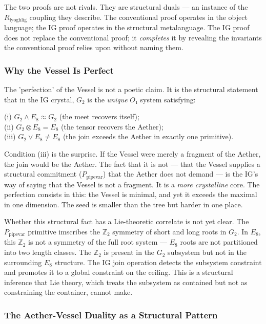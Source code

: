 \documentclass[12pt,a4paper]{article}
\begin{document}
The two proofs are not rivals. They are structural duals --- an instance of the $R_{\text{lyoghlig}}$ coupling they describe. The conventional proof operates in the object language; the IG proof operates in the structural metalanguage. The IG proof does not replace the conventional proof; it \emph{completes} it by revealing the invariants the conventional proof relies upon without naming them.

\subsubsection{Why the Vessel Is Perfect}

The 'perfection' of the Vessel is not a poetic claim. It is the structural statement that in the IG crystal, $G_2$ is the \emph{unique} $O₁$ system satisfying:

(i) $G_2 \wedge E_8 \approx G_2$ (the meet recovers itself); \\
(ii) $G_2 \otimes E_8 = E_8$ (the tensor recovers the Aether); \\
(iii) $G_2 \vee E_8 \neq E_8$ (the join exceeds the Aether in exactly one primitive).

Condition (iii) is the surprise. If the Vessel were merely a fragment of the Aether, the join would be the Aether. The fact that it is not --- that the Vessel supplies a structural commitment ($P_{\text{pipevar}}$) that the Aether does not demand --- is the IG's way of saying that the Vessel is not a fragment. It is a \emph{more crystalline} core. The perfection consists in this: the Vessel is minimal, and yet it exceeds the maximal in one dimension. The seed is smaller than the tree but harder in one place.

Whether this structural fact has a Lie-theoretic correlate is not yet clear. The $P_{\text{pipevar}}$ primitive imscribes the $\mathbb{Z}_2$ symmetry of short and long roots in $G_2$. In $E_8$, this $\mathbb{Z}_2$ is not a symmetry of the full root system --- $E_8$ roots are not partitioned into two length classes. The $\mathbb{Z}_2$ is present in the $G_2$ subsystem but not in the surrounding $E_8$ structure. The IG join operation detects the subsystem constraint and promotes it to a global constraint on the ceiling. This is a structural inference that Lie theory, which treats the subsystem as contained but not as constraining the container, cannot make.

\subsubsection{The Aether-Vessel Duality as a Structural Pattern}
\end{document}
